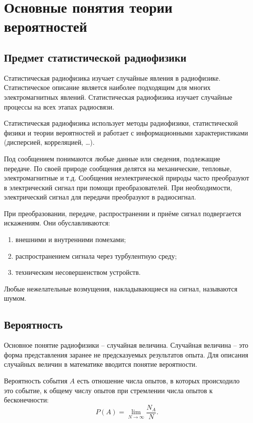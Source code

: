 \section{Основные понятия теории вероятностей}
\subsection{Предмет статистической радиофизики}

Статистическая радиофизика изучает случайные явления в радиофизике.
Статистическое описание является наиболее подходящим для многих электромагнитных
явлений. Статистическая радиофизика изучает случайные процессы на всех этапах
радиосвязи.

Статистическая радиофизика использует методы радиофизики, статистической физики
и теории вероятностей и работает с информационными характеристиками (дисперсией,
корреляцией, \ldots).

Под сообщением понимаются любые данные или сведения, подлежащие передаче. По
своей природе сообщения делятся на механические, тепловые, электромагнитные и
т.д. Сообщения неэлектрической природы часто преобразуют в электрический сигнал
при помощи преобразователей. При необходимости, электрический сигнал для
передачи преобразуют в радиосигнал.

При преобразовании, передаче, распространении и приёме сигнал подвергается
искажениям. Они обуславливаются:
\begin{enumerate}
    \item внешними и внутренними помехами;
    \item распространением сигнала через турбулентную среду;
    \item техническим несовершенством устройств.
\end{enumerate}
Любые нежелательные возмущения, накладывающиеся на сигнал, называются шумом.

\subsection{Вероятность}

Основное понятие радиофизики -- случайная величина. Случайная величина -- это
форма представления заранее не предсказуемых результатов опыта. Для описания
случайных величин в математике вводится понятие вероятности.

Вероятность события \( A \) есть отношение числа опытов, в которых происходило
это событие, к общему числу опытов при стремлении числа опытов к бесконечности:
\[
    P(A) = \lim_{N\to\infty}\frac{N_A}{N}.
\]


